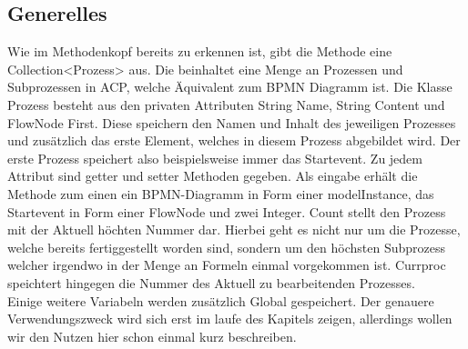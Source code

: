 \subsection{Generelles}
Wie im Methodenkopf bereits zu erkennen ist, gibt die Methode eine Collection<Prozess> aus. Die beinhaltet eine Menge an Prozessen und Subprozessen in ACP, welche Äquivalent zum BPMN Diagramm ist. Die Klasse Prozess besteht aus den privaten Attributen String Name, String Content und FlowNode First. Diese speichern den Namen und Inhalt des jeweiligen Prozesses und zusätzlich das erste Element, welches in diesem Prozess abgebildet wird. Der erste Prozess speichert also beispielsweise immer das Startevent. Zu jedem Attribut sind getter und setter Methoden gegeben. Als eingabe erhält die Methode zum einen ein BPMN-Diagramm in Form einer modelInstance, das Startevent in Form einer FlowNode und zwei Integer. Count stellt den Prozess mit der Aktuell höchten Nummer dar. Hierbei geht es nicht nur um die Prozesse, welche bereits fertiggestellt worden sind, sondern um den höchsten Subprozess welcher irgendwo in der Menge an Formeln einmal vorgekommen ist. Currproc speichtert hingegen die Nummer des Aktuell zu bearbeitenden Prozesses. \\
Einige weitere Variabeln werden zusätzlich Global gespeichert. Der genauere Verwendungszweck wird sich erst im laufe des Kapitels zeigen, allerdings wollen wir den Nutzen hier schon einmal kurz beschreiben.\\
